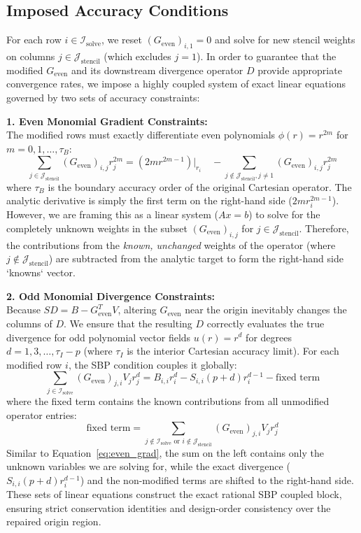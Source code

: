 \documentclass[reprint,amsmath,amssymb,aps]{revtex4-2}
\begin{document}
\subsection{Imposed Accuracy Conditions}
For each row $i \in \mathcal{I}_{\text{solve}}$, we reset $(G_{\text{even}})_{i,1} = 0$ and solve for new stencil weights on columns $j \in \mathcal{J}_{\text{stencil}}$ (which excludes $j=1$). 
In order to guarantee that the modified $G_{\text{even}}$ and its downstream divergence operator $D$ provide appropriate convergence rates, we impose a highly coupled system of exact linear equations governed by two sets of accuracy constraints:

\textbf{1. Even Monomial Gradient Constraints:} \\
The modified rows must exactly differentiate even polynomials $\phi(r) = r^{2m}$ for $m = 0, 1, \dots, \tau_B$:
\begin{equation} \label{eq:even_grad}
    \sum_{j \in \mathcal{J}_{\text{stencil}}} (G_{\text{even}})_{i,j} r_j^{2m} = 
    \left( 2m r^{2m-1} \right)\big|_{r_i} 
    \quad - \!\!\!\sum_{j \notin \mathcal{J}_{\text{stencil}}, j \neq 1}\!\!\! (G_{\text{even}})_{i,j} r_j^{2m}
\end{equation}
where $\tau_B$ is the boundary accuracy order of the original Cartesian operator. 
The analytic derivative is simply the first term on the right-hand side ($2m r_i^{2m-1}$). However, we are framing this as a linear system ($Ax=b$) to solve for the completely unknown weights in the subset $(G_{\text{even}})_{i,j}$ for $j \in \mathcal{J}_{\text{stencil}}$. Therefore, the contributions from the \textit{known, unchanged} weights of the operator (where $j \notin \mathcal{J}_{\text{stencil}}$) are subtracted from the analytic target to form the right-hand side `knowns` vector.

\textbf{2. Odd Monomial Divergence Constraints:} \\
Because $S D = B - G_{\text{even}}^T V$, altering $G_{\text{even}}$ near the origin inevitably changes the columns of $D$. We ensure that the resulting $D$ correctly evaluates the true divergence for odd polynomial vector fields $u(r) = r^d$ for degrees $d = 1, 3, \ldots, \tau_I - p$ (where $\tau_I$ is the interior Cartesian accuracy limit). For each modified row $i$, the SBP condition couples it globally:
\begin{equation}
    \sum_{j \in \mathcal{I}_{\text{solve}}} (G_{\text{even}})_{j,i} V_j r_j^d = B_{i,i} r_i^d - S_{i,i}(p+d) r_i^{d-1} - \text{fixed term}
\end{equation}
where the fixed term contains the known contributions from all unmodified operator entries:
\begin{equation}
    \text{fixed term} = \sum_{j \notin \mathcal{I}_{\text{solve}} \text{ or } i \notin \mathcal{J}_{\text{stencil}}} (G_{\text{even}})_{j,i} V_j r_j^d
\end{equation}
Similar to Equation~\ref{eq:even_grad}, the sum on the left contains only the unknown variables we are solving for, while the exact divergence ($S_{i,i}(p+d)r_i^{d-1}$) and the non-modified terms are shifted to the right-hand side. These sets of linear equations construct the exact rational SBP coupled block, ensuring strict conservation identities and design-order consistency over the repaired origin region.
\end{document}
